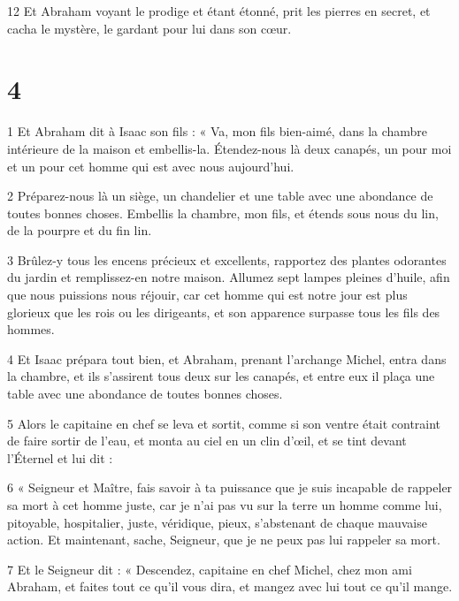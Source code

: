 \par 12 Et Abraham voyant le prodige et étant étonné, prit les pierres en secret, et cacha le mystère, le gardant pour lui dans son cœur.

\chapter{4}

\par 1 Et Abraham dit à Isaac son fils : « Va, mon fils bien-aimé, dans la chambre intérieure de la maison et embellis-la. Étendez-nous là deux canapés, un pour moi et un pour cet homme qui est avec nous aujourd'hui.

\par 2 Préparez-nous là un siège, un chandelier et une table avec une abondance de toutes bonnes choses. Embellis la chambre, mon fils, et étends sous nous du lin, de la pourpre et du fin lin.

\par 3 Brûlez-y tous les encens précieux et excellents, rapportez des plantes odorantes du jardin et remplissez-en notre maison. Allumez sept lampes pleines d'huile, afin que nous puissions nous réjouir, car cet homme qui est notre jour est plus glorieux que les rois ou les dirigeants, et son apparence surpasse tous les fils des hommes.

\par 4 Et Isaac prépara tout bien, et Abraham, prenant l'archange Michel, entra dans la chambre, et ils s'assirent tous deux sur les canapés, et entre eux il plaça une table avec une abondance de toutes bonnes choses.

\par 5 Alors le capitaine en chef se leva et sortit, comme si son ventre était contraint de faire sortir de l'eau, et monta au ciel en un clin d'œil, et se tint devant l'Éternel et lui dit :

\par 6 « Seigneur et Maître, fais savoir à ta puissance que je suis incapable de rappeler sa mort à cet homme juste, car je n'ai pas vu sur la terre un homme comme lui, pitoyable, hospitalier, juste, véridique, pieux, s'abstenant de chaque mauvaise action. Et maintenant, sache, Seigneur, que je ne peux pas lui rappeler sa mort.

\par 7 Et le Seigneur dit : « Descendez, capitaine en chef Michel, chez mon ami Abraham, et faites tout ce qu'il vous dira, et mangez avec lui tout ce qu'il mange.

